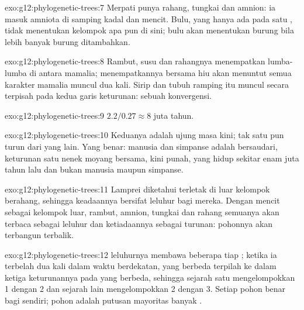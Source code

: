 \begin{solution}{exo:g12:phylogenetic-trees:7}
Merpati punya rahang, tungkai dan amnion: ia masuk  amniota di
samping kadal dan mencit. Bulu, yang hanya ada pada satu , tidak
menentukan kelompok apa pun di sini; bulu akan menentukan burung bila
lebih banyak burung ditambahkan.
\end{solution}

\begin{solution}{exo:g12:phylogenetic-trees:8}
Rambut, susu dan rahangnya menempatkan lumba-lumba di antara mamalia;
menempatkannya bersama hiu akan menuntut semua karakter mamalia muncul
dua kali. Sirip dan tubuh ramping itu muncul secara terpisah pada
kedua garis keturunan: sebuah konvergensi.
\end{solution}

\begin{solution}{exo:g12:phylogenetic-trees:9}
$2.2/0.27 \approx 8$ juta tahun.
\end{solution}

\begin{solution}{exo:g12:phylogenetic-trees:10}
Keduanya adalah ujung masa kini; tak satu pun turun dari yang lain.
Yang benar: manusia dan simpanse adalah  bersaudari, keturunan
satu nenek moyang bersama, kini punah, yang hidup sekitar enam juta
tahun lalu dan bukan manusia maupun simpanse.
\end{solution}

\begin{solution}{exo:g12:phylogenetic-trees:11}
Lamprei diketahui terletak di luar kelompok  berahang,
sehingga keadaannya bersifat leluhur bagi mereka. Dengan mencit
sebagai kelompok luar, rambut, amnion, tungkai dan rahang semuanya
akan terbaca sebagai leluhur dan ketiadaannya sebagai turunan: pohonnya
akan terbangun terbalik.
\end{solution}

\begin{solution}{exo:g12:phylogenetic-trees:12}
 leluhurnya membawa beberapa  tiap ; ketika ia terbelah
dua kali dalam waktu berdekatan,  yang berbeda terpilah ke dalam
ketiga keturunannya pada  yang berbeda, sehingga sejarah satu 
mengelompokkan  1 dengan 2 dan sejarah  lain mengelompokkan
2 dengan 3. Setiap pohon  benar bagi  sendiri; pohon 
adalah putusan mayoritas banyak .
\end{solution}

